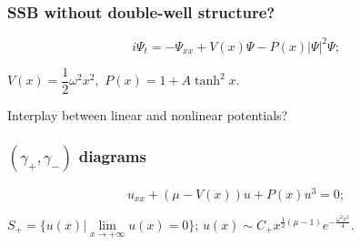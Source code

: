 \documentclass{beamer}
\begin{document}
\begin{frame}
\frametitle{SSB without double-well structure?}
$$i\Psi_t = -\Psi_{xx} + V(x) \Psi - P(x) |\Psi|^2 \Psi;$$
\begin{center}
$V(x) = \dfrac{1}{2} \omega^2 x^2,$ \quad $P(x) = 1 + A \tanh^2{x}.$
\end{center}

\begin{figure}
\label{pic:potentials}
\end{figure}

\begin{center}
Interplay between linear and nonlinear potentials?
\end{center}
\end{frame}


\begin{frame}
\frametitle{$(\gamma_+, \gamma_-)$ diagrams\footnotemark[5]}
\begin{equation}
u_{xx} + (\mu - V(x)) u + P(x) u^3 = 0;
\label{eq:stationary}
\end{equation}

\begin{center}
$S_+ = \{u(x) | \lim \limits_{x \to +\infty} u(x) = 0\}$; \quad $u(x) \sim C_+ x^{\frac{1}{2}(\mu - 1)} e^{-\frac{\omega^2 x^2}{4}}$.
\end{center}

\begin{figure}
\label{pic:right_asymptotic}
\end{figure}


\end{frame}
\end{document}
